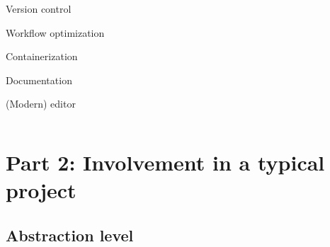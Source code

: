 \documentclass[usenames,dvipsnames]{beamer}
\theoremstyle{plain}
\theoremstyle{definition}
\begin{document}


\begin{frame}{\setframetitle{}}
  
  \begin{columns}[t]
    
    \begin{itemize}
      \item \textcolor{bg!85!normal text.fg}{Version control
      \item Workflow optimization    
      \item Containerization 
      \item Documentation}
      \item (Modern) editor
    \end{itemize}
    
    \begin{figure}
      {}
    \end{figure}
  \end{columns}
  
\end{frame}



\section{Part 2: Involvement in a typical project}
\subsection{Abstraction level}




\begin{frame}{\setframetitle{}}
  {
 \begin{figure}
         {}
 \end{figure}
 }
\end{frame}
\end{document}
